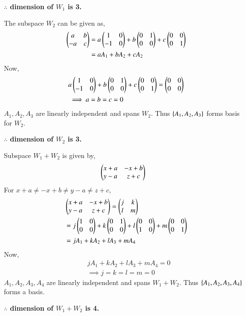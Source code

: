 \begin{enumerate}
\textbf{$\therefore$ dimension of $W_1$ is 3.}   

The subspace $W_2$ can be given as, 
\begin{align}
    \begin{pmatrix}a&b\\-a&c\end{pmatrix} &= a\begin{pmatrix}1&0\\-1&0\end{pmatrix} + b\begin{pmatrix}0&1\\0&0\end{pmatrix} + c\begin{pmatrix}0&0\\0&1\end{pmatrix} \\
    &= aA_1 + bA_2 + cA_2 \label{eq:solutions/2/3/7/span_w2}
\end{align}
Now, 
\begin{align}
    &a\begin{pmatrix}1&0\\-1&0\end{pmatrix} + b\begin{pmatrix}0&1\\0&0\end{pmatrix} + c\begin{pmatrix}0&0\\0&1\end{pmatrix} = \begin{pmatrix}0&0\\0&0\end{pmatrix} \\
    &\implies a = b = c = 0 \label{eq:solutions/2/3/7/indep_w2}
\end{align}
$A_1, A_2, A_3$ are linearly independent and spans $W_2$. Thus $\left\{A_1, A_2, A_3\right\}$ forms basis for $W_2$. 

\textbf{$\therefore$ dimension of $W_2$ is 3.}

Subspace $W_1+W_2$ is given by, 
\begin{align}
    &\begin{pmatrix}x+a&-x+b\\y-a&z+c\end{pmatrix}
\end{align}
For $x+a\ne -x+b\ne y-a\ne z+c $, 
\begin{align}
    &\begin{pmatrix}x+a&-x+b\\y-a&z+c\end{pmatrix} = \begin{pmatrix}j&k\\l&m\end{pmatrix} \\
    &= j\begin{pmatrix}1&0\\0&0\end{pmatrix}+k\begin{pmatrix}0&1\\0&0\end{pmatrix}+l\begin{pmatrix}0&0\\1&0\end{pmatrix} + m\begin{pmatrix}0&0\\0&1\end{pmatrix} \\
    &= jA_1 + kA_2 + lA_3 + mA_4
\end{align}
Now, 
\begin{align}
    &jA_1 + kA_2 + lA_3 + mA_4 = 0 \\
    &\implies j=k=l=m=0
\end{align}
$A_1, A_2, A_3, A_4 $ are linearly independent and spans $W_1+W_2$. 
Thus $\left\{A_1, A_2, A_3, A_4\right\}$ forms a basis. 

\textbf{$\therefore$ dimension of $W_1+W_2$ is 4.}


\end{enumerate}

